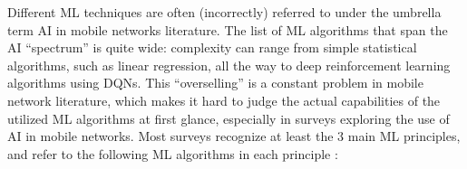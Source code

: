 			
			
			Different \ac{ML} techniques are often (incorrectly) referred to under the umbrella term \ac{AI} in mobile networks literature.
			The list of \ac{ML} algorithms that span the \ac{AI} ``spectrum'' is quite wide: complexity can range from simple statistical algorithms, such as linear regression, all the way to deep reinforcement learning algorithms using \acp{DQN}.
			This ``overselling'' is a constant problem in mobile network literature, which makes it hard to judge the actual capabilities of the utilized \ac{ML} algorithms at first glance, especially in surveys exploring the use of \ac{AI} in mobile networks.
			Most surveys recognize at least the $3$ main \ac{ML} principles, and refer to the following \ac{ML} algorithms in each principle \cite{ai_for_5g, ai_in_5g, intelligent_5g}:
